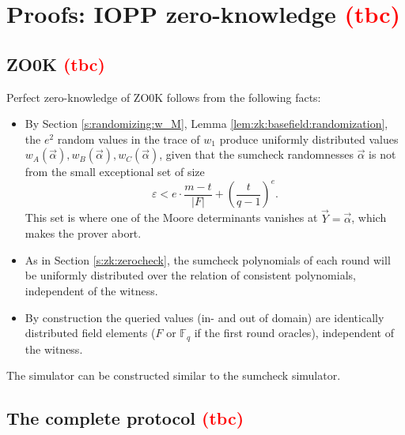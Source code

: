 \section{Proofs: IOPP zero-knowledge \textcolor{red}{(tbc)}}
\label{s:IOPPzk}


\subsection{ZO0K \textcolor{red}{(tbc)}}
\label{s:IOPPzk:zook}

Perfect zero-knowledge of ZO0K follows from the following facts:
\begin{itemize}
    \item
    By Section \ref{s:randomizing:w_M}, Lemma \ref{lem:zk:basefield:randomization}, the $e^2$ random values in the trace of $w_1$ produce uniformly distributed values $w_A(\vec\alpha), w_B(\vec\alpha), w_C(\vec\alpha)$, given that the sumcheck randomnesses $\vec \alpha$ is not from the small exceptional set of size
    \begin{equation}
    \varepsilon < e\cdot \frac{m-t}{|F|} + \left(\frac{t}{q-1}\right)^e. 
    \end{equation}
    This set is where one of the Moore determinants vanishes at $\vec Y =\vec \alpha$, which makes the prover abort. 
 
    \item 
    As in Section \ref{s:zk:zerocheck}, the sumcheck polynomials of each round will be uniformly distributed over the relation of consistent polynomials, independent of the witness. 
    \item 
    By construction the queried values (in- and out of domain) are identically distributed field elements ($F$ or $\mathbb F_q$ if the first round oracles), independent of the witness. 
\end{itemize}


The simulator can be constructed similar to the sumcheck simulator.


\subsection{The complete protocol \textcolor{red}{(tbc)}}
\label{s:IOPPzk:complete}